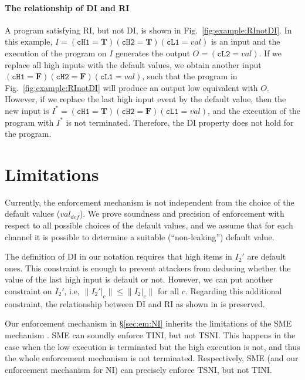 \documentclass[10pt,a4paper,oneside]{article}
\def\restrict#1#2{\ensuremath{{#1}|_{#2}}}
\def\VTRUE{\ensuremath{\textbf{T}}}
\def\VFALSE{\ensuremath{\textbf{F}}}
\def\chnl{\ensuremath{c}}
\def\defVal{\ensuremath{val_{def}}}
\def\valueM{\ensuremath{val}}
\def\length#1{\ensuremath{\parallel#1\parallel}}
\def\linecode#1{{\texttt{#1}}}
\begin{document}
\paragraph{The relationship of DI and RI}
A program satisfying RI, but not DI, is shown in Fig.~\ref{fig:example:RInotDI}. In this example, $I = (\linecode{cH1}=\VTRUE)(\linecode{cH2}=\VTRUE)(\linecode{cL1}=\valueM)$ is an input and the execution of the program on $I$ generates the output $O = (\linecode{cL2}=\valueM)$. If we replace all high inputs with the default values, we obtain another input $(\linecode{cH1}=\VFALSE)(\linecode{cH2}=\VFALSE)(\linecode{cL1}=\valueM)$, such that the program in Fig.~\ref{fig:example:RInotDI} will produce an output low equivalent with $O$. However, if we replace the last high input event by the default value, then the new input is $I^*  = (\linecode{cH1}=\VTRUE)(\linecode{cH2}=\VFALSE)(\linecode{cL1}=\valueM)$, and the execution of the program with $I^*$ is not terminated. Therefore, the DI property does not hold for the program.


\section{Limitations}\label{sec:discussion:limitations}
Currently, the enforcement mechanism is not independent from the choice of the default values (\defVal). We prove soundness and precision of enforcement with respect to all possible choices of the default values, and we assume that for each channel it is possible to determine a suitable (``non-leaking'') default value.


The definition of DI in our notation requires that high items in $I_2'$ are default ones. This constraint is enough to prevent attackers from deducing whether the value of the last high input is default or not. However, we can put another constraint on $I_2'$, i.e, $\length{\restrict{I_2'}{\chnl}} \leq \length{\restrict{I_2}{\chnl}}$ for all \chnl. Regarding this additional constraint, the relationship between DI and RI as shown in \cite{MANT-00-CSF} is preserved.




Our enforcement mechanism in \S\ref{sec:em:NI} inherits the limitations of the SME mechanism \cite{Devr-Pies-10-IEEESP}. SME can soundly enforce TINI, but not TSNI. This happens in the case when the low execution is terminated but the high execution is not, and thus the whole enforcement mechanism is not terminated. Respectively, SME (and our enforcement mechanism for NI) can precisely enforce TSNI, but not TINI.
\end{document}
